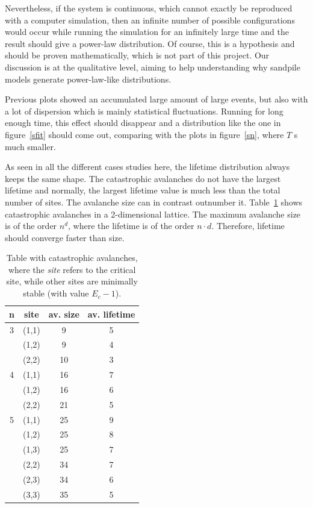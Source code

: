 Nevertheless, if the system is continuous, which cannot exactly be reproduced with a computer simulation,
then an infinite number of possible configurations would occur while running the simulation for an infinitely large time and the result should give a power-law distribution.
Of course, this is a hypothesis and should be proven mathematically, which is not part of this project.
Our discussion is at the qualitative level, aiming to help understanding why sandpile models generate power-law-like distributions.

Previous plots showed an accumulated large amount of large events, but also with a lot of dispersion which is mainly statistical fluctuations. Running for long enough time, this effect should disappear and a distribution like the one in figure~\ref{sfit} should come out, comparing with the plots in figure~\ref{sn}, where $T$ s much smaller.

\vspace{1em}

As seen in all the different cases studies here, the lifetime distribution always keeps the same shape.
The catastrophic avalanches do not have the largest lifetime and normally, the largest lifetime value is much less than the total number of sites. The avalanche size can in contrast outnumber it.
Table~\ref{tabn2} shows catastrophic avalanches in a 2-dimensional lattice. The maximum avalanche size is of the order $n^d$, where the lifetime is of the order $n\cdot d$.
Therefore, lifetime should converge faster than size.

\begin{table}
\begin{tabular}{|c|c|c|c|}
 \hline
 n & site & av. size & av. lifetime\\ \hline
 3 & (1,1) & 9 & 5 \\ 
                    & (1,2) & 9 & 4 \\ 
                    & (2,2) & 10 & 3 \\ \hline
 4 & (1,1) & 16 & 7 \\ 
                    & (1,2) & 16 & 6 \\ 
                    & (2,2) & 21 & 5 \\ \hline
 5 & (1,1) & 25 & 9 \\ 
                    & (1,2) & 25 & 8 \\ 
                    & (1,3) & 25 & 7 \\ 
                    & (2,2) & 34 & 7 \\ 
                    & (2,3) & 34 & 6 \\ 
                    & (3,3) & 35 & 5 \\ \hline
\end{tabular}
\caption{Table with catastrophic avalanches, where the \emph{site} refers to the critical site, while other sites are minimally stable (with value $E_c-1$).}
\label{tabn2}
\end{table} 

